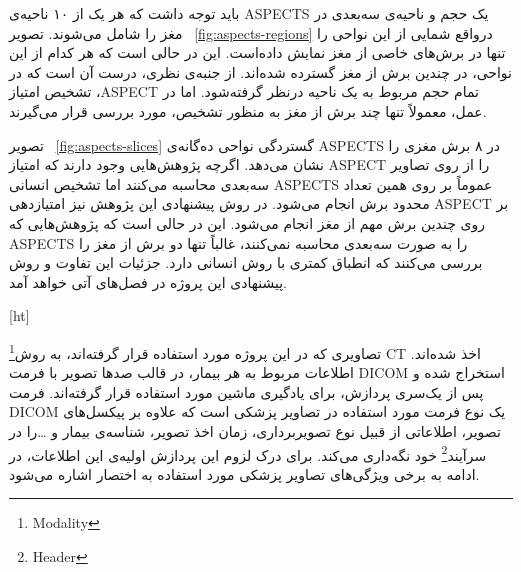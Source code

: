 باید توجه داشت که هر یک از ۱۰ ناحیه‌ی ASPECTS یک حجم و ناحیه‌ی سه‌بعدی در مغز را شامل می‌شوند.
تصویر ~\ref{fig:aspects-regions} درواقع شمایی از این نواحی را تنها در برش‌های خاصی از مغز نمایش داده‌است.
این در حالی است که هر کدام از این نواحی، در چندین برش از مغز گسترده شده‌اند.
از جنبه‌ی نظری، درست آن است که در تشخیص امتیاز ،ASPECT تمام حجم مربوط به یک ناحیه درنظر گرفته‌شود.
اما در عمل، معمولاً تنها چند برش از مغز به منظور تشخیص، مورد بررسی قرار می‌گیرند.


تصویر ~\ref{fig:aspects-slices}
گستردگی نواحی ده‌گانه‌ی ASPECTS در ۸ برش مغزی را نشان می‌دهد.
اگرچه پژوهش‌هایی وجود دارند که امتیاز ASPECT را از روی تصاویر سه‌بعدی محاسبه می‌کنند اما تشخیص انسانی ASPECTS عموماً بر روی همین تعداد محدود برش انجام می‌شود.
در روش پیشنهادی این پژوهش نیز امتیازدهی ASPECT بر روی چندین برش مهم از مغز انجام می‌شود.
این در حالی است که
پژوهش‌هایی که ASPECTS را به صورت سه‌بعدی محاسبه نمی‌کنند، غالباً تنها دو برش از مغز را بررسی می‌کنند
که انطباق کمتری با روش انسانی دارد.
جزئیات این تفاوت و روش پیشنهادی این پروژه در فصل‌های آتی خواهد آمد.


[ht]


تصاویری که در این پروژه مورد استفاده قرار گرفته‌اند، به روش\footnote{Modality}
 CT اخذ شده‌اند.
اطلاعات مربوط به هر بیمار، در قالب صدها تصویر با فرمت DICOM استخراج شده و پس از یک‌سری پردازش، برای یادگیری ماشین مورد استفاده قرار گرفته‌اند.
فرمت DICOM یک نوع فرمت مورد استفاده در تصاویر پزشکی است که علاوه بر پیکسل‌های تصویر، اطلاعاتی از قبیل نوع تصویربرداری، زمان اخذ تصویر، شناسه‌ی بیمار و \dots را در 
سرآیند\footnote{Header}
خود نگه‌داری می‌کند.
برای درک لزوم این پردازش اولیه‌ی این اطلاعات، در ادامه به برخی ویژگی‌های تصاویر پزشکی مورد استفاده به اختصار اشاره می‌شود.

